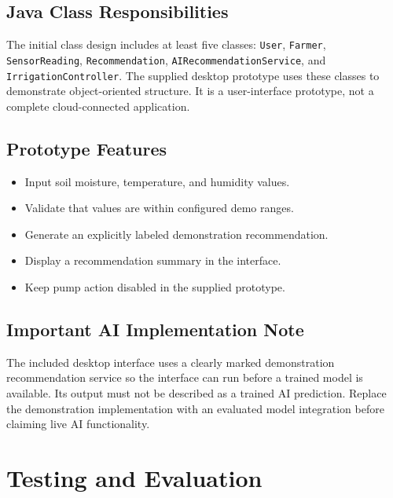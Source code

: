 \documentclass[12pt,a4paper]{report}
\begin{document}
\section{Java Class Responsibilities}

The initial class design includes at least five classes: \texttt{User}, \texttt{Farmer}, \texttt{SensorReading}, \texttt{Recommendation}, \texttt{AIRecommendationService}, and \texttt{IrrigationController}. The supplied desktop prototype uses these classes to demonstrate object-oriented structure. It is a user-interface prototype, not a complete cloud-connected application.

\section{Prototype Features}

\begin{itemize}[leftmargin=*]

\item Input soil moisture, temperature, and humidity values.

\item Validate that values are within configured demo ranges.

\item Generate an explicitly labeled demonstration recommendation.

\item Display a recommendation summary in the interface.

\item Keep pump action disabled in the supplied prototype.

\end{itemize}

\section{Important AI Implementation Note}

The included desktop interface uses a clearly marked demonstration recommendation service so the interface can run before a trained model is available. Its output must not be described as a trained AI prediction. Replace the demonstration implementation with an evaluated model integration before claiming live AI functionality.

\chapter{Testing and Evaluation}
\end{document}
